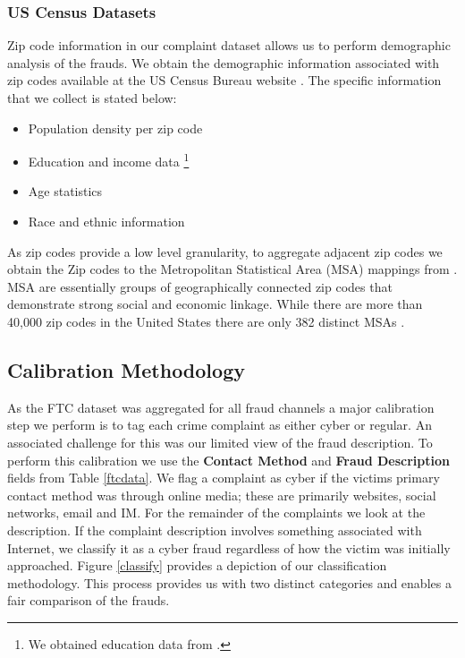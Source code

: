 \documentclass[conference]{IEEEtran}
\begin{document}
\subsubsection{US Census Datasets}
Zip code information in our complaint dataset allows us to perform demographic analysis of the frauds. We obtain the demographic information associated with zip codes available at the US Census Bureau website \cite{uscensus}. The specific information that we collect is stated below:

\begin{itemize}
\vspace{8pt}
  \item Population density per zip code
  \item Education and income data \footnote{We obtained education data from \cite{zipatlas}.}
  \item Age statistics
  \item Race and ethnic information
  \vspace{8pt}
\end{itemize}

As zip codes provide a low level granularity, to aggregate adjacent zip codes we obtain the Zip codes to the Metropolitan Statistical Area (MSA) mappings from \cite{uslaborstats}. MSA are essentially groups of geographically connected zip codes that demonstrate strong social and economic linkage. While there are more than 40,000 zip codes in the United States there are only 382 distinct MSAs \cite{uscensus}.

\subsection{Calibration Methodology}

As the FTC dataset was aggregated for all fraud channels a major calibration step we perform is to tag each crime complaint as either cyber or regular. An associated challenge for this was our limited view of the fraud description. To perform this calibration we use the \textbf{Contact Method} and \textbf{Fraud Description} fields from Table \ref{ftcdata}. We flag a complaint as cyber if the victims primary contact method was through online media; these are primarily websites, social networks, email and IM. For the remainder of the complaints we look at the description. If the complaint description involves something associated with Internet, we classify it as a cyber fraud regardless of how the victim was initially approached. Figure \ref{classify} provides a depiction of our classification methodology. This process  provides us with two distinct categories  and enables a fair comparison of the frauds. 
     
\end{document}
